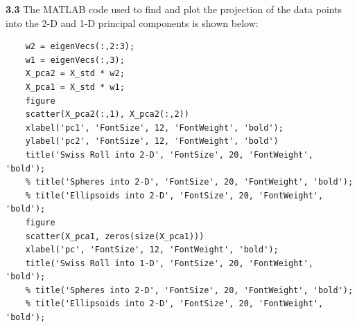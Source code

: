 \documentclass[a4paper]{article}
\begin{document}
\begin{spacing}{2.0}
	\textbf{3.3} 
	The MATLAB code used to find and plot the projection of the data points into the 2-D and 1-D principal  
	components is shown below:
	\begin{lstlisting}
	w2 = eigenVecs(:,2:3);
	w1 = eigenVecs(:,3);
	X_pca2 = X_std * w2;
	X_pca1 = X_std * w1;
	figure
	scatter(X_pca2(:,1), X_pca2(:,2))
	xlabel('pc1', 'FontSize', 12, 'FontWeight', 'bold');
	ylabel('pc2', 'FontSize', 12, 'FontWeight', 'bold')
	title('Swiss Roll into 2-D', 'FontSize', 20, 'FontWeight', 'bold');
	% title('Spheres into 2-D', 'FontSize', 20, 'FontWeight', 'bold');
	% title('Ellipsoids into 2-D', 'FontSize', 20, 'FontWeight', 'bold');
	figure
	scatter(X_pca1, zeros(size(X_pca1)))
	xlabel('pc', 'FontSize', 12, 'FontWeight', 'bold');
	title('Swiss Roll into 1-D', 'FontSize', 20, 'FontWeight', 'bold');
	% title('Spheres into 2-D', 'FontSize', 20, 'FontWeight', 'bold');
	% title('Ellipsoids into 2-D', 'FontSize', 20, 'FontWeight', 'bold');
	\end{lstlisting}
	

\end{spacing}
\end{document}
